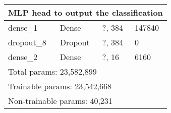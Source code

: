 \begin{longtable}{llll}
\midrule
\multicolumn{4}{c}{MLP head to output the classification} \\
\midrule
                    dense\_1 &                  Dense &                            ?, 384 &   147840 \\
                  dropout\_8 &                Dropout &                            ?, 384 &        0 \\
                    dense\_2 &                  Dense &                             ?, 16 &     6160 \\
\midrule
\multicolumn{4}{l}{Total params: 23,582,899} \\
\multicolumn{4}{l}{Trainable params: 23,542,668} \\
\multicolumn{4}{l}{Non-trainable params: 40,231} \\
\bottomrule
\end{longtable}